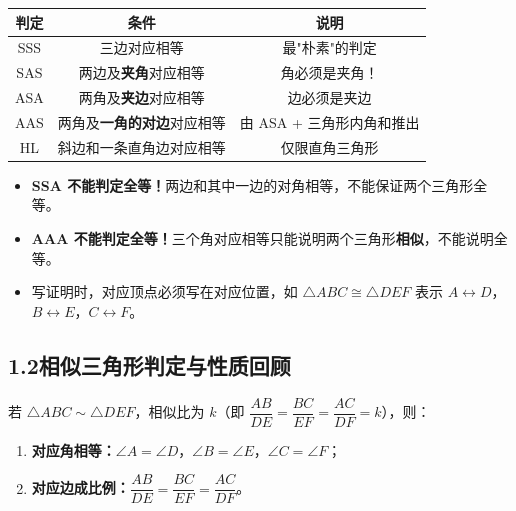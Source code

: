 \documentclass[12pt, a4paper]{ctexart}
\begin{document}
\begin{knowledgebox}[全等三角形的五种判定方法]
\begin{center}
\renewcommand{\arraystretch}{1.5}
\begin{tabular}{|c|c|c|}
\hline
\textbf{判定} & \textbf{条件} & \textbf{说明} \\
\hline
SSS & 三边对应相等 & 最"朴素"的判定 \\
\hline
SAS & 两边及\textbf{夹角}对应相等 & \textcolor{warnred}{角必须是夹角！} \\
\hline
ASA & 两角及\textbf{夹边}对应相等 & 边必须是夹边 \\
\hline
AAS & 两角及\textbf{一角的对边}对应相等 & 由 ASA + 三角形内角和推出 \\
\hline
HL & 斜边和一条直角边对应相等 & \textcolor{warnred}{仅限直角三角形} \\
\hline
\end{tabular}
\end{center}

\begin{warnbox}[易错提醒]
\begin{itemize}[nosep]
  \item \textbf{SSA 不能判定全等！}两边和其中一边的对角相等，不能保证两个三角形全等。
  \item \textbf{AAA 不能判定全等！}三个角对应相等只能说明两个三角形\textbf{相似}，不能说明全等。
  \item 写证明时，对应顶点必须写在对应位置，如 $\triangle ABC \cong \triangle DEF$ 表示 $A\leftrightarrow D$，$B\leftrightarrow E$，$C\leftrightarrow F$。
\end{itemize}
\end{warnbox}
\end{knowledgebox}

\subsection*{1.2\quad 相似三角形判定与性质回顾}

\begin{knowledgebox}[相似三角形的性质]
若 $\triangle ABC \sim \triangle DEF$，相似比为 $k$（即 $\dfrac{AB}{DE}=\dfrac{BC}{EF}=\dfrac{AC}{DF}=k$），则：
\begin{enumerate}[nosep]
  \item \textbf{对应角相等：}$\angle A=\angle D$，$\angle B=\angle E$，$\angle C=\angle F$；
  \item \textbf{对应边成比例：}$\dfrac{AB}{DE}=\dfrac{BC}{EF}=\dfrac{AC}{DF}$。
\end{enumerate}
\end{knowledgebox}
\end{document}
